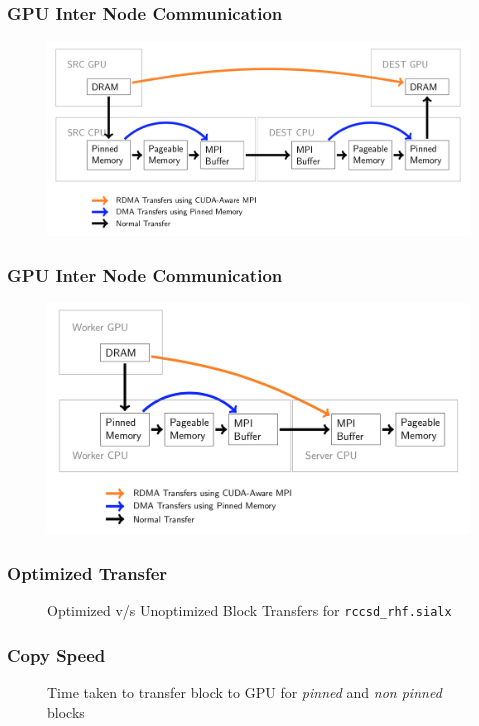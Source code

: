 \documentclass{beamer}
\begin{document}
\begin{frame}[fragile]
  \frametitle{GPU Inter Node Communication}
  \pause
  \begin{figure}[h] %
    \includegraphics[width=\textwidth]{images/2gpu_comm.png}
  \end{figure}
\end{frame}

\begin{frame}[fragile]
  \frametitle{GPU Inter Node Communication}
  \pause
  \begin{figure}[h] %
    \includegraphics[width=\textwidth]{images/1gpu_comm.png}
  \end{figure}
\end{frame}

\begin{frame}[fragile]
  \frametitle{Optimized Transfer}
  \pause
  \begin{figure}[h]
    \resizebox{.9\linewidth}{!}{}
    \caption{Optimized v/s Unoptimized Block Transfers for \texttt{rccsd\_rhf.sialx}}
  \end{figure}
\end{frame}

\begin{frame}[fragile]
  \frametitle{Copy Speed}
  \pause
  \begin{figure}[h]
    \resizebox{.9\linewidth}{!}{}
    \caption{Time taken to transfer block to GPU for \textit{pinned} and \textit{non pinned} blocks}
  \end{figure}
\end{frame}
\end{document}
